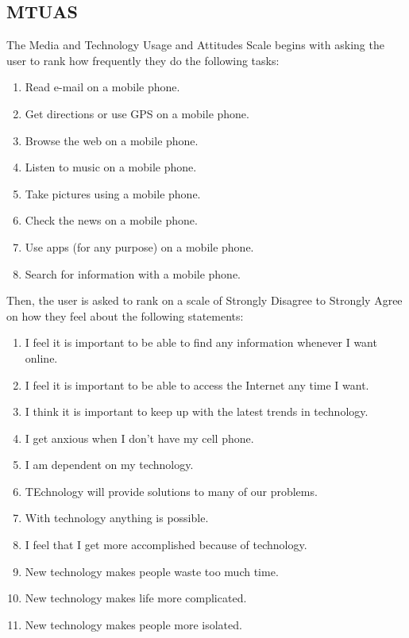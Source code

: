 \documentclass[12pt, title page, manuscript, nonacm]{acmart}
\begin{document}
\subsection*{MTUAS}
The Media and Technology Usage and Attitudes Scale begins with asking the user to rank how frequently they do the following tasks:
\begin{enumerate}
    \item Read e-mail on a mobile phone.
    \item Get directions or use GPS on a mobile phone.
    \item Browse the web on a mobile phone.
    \item Listen to music on a mobile phone.
    \item Take pictures using a mobile phone.
    \item Check the news on a mobile phone.
    \item Use apps (for any purpose) on a mobile phone.
    \item Search for information with a mobile phone.
\end{enumerate}
Then, the user is asked to rank on a scale of Strongly Disagree to Strongly Agree on how they feel about the following statements:
\begin{enumerate}
    \item I feel it is important to be able to find any information whenever I want online.
    \item I feel it is important to be able to access the Internet any time I want.
    \item I think it is important to keep up with the latest trends in technology.
    \item I get anxious when I don't have my cell phone.
    \item I am dependent on my technology.
    \item TEchnology will provide solutions to many of our problems.
    \item With technology anything is possible.
    \item I feel that I get more accomplished because of technology.
    \item New technology makes people waste too much time.
    \item New technology makes life more complicated.
    \item New technology makes people more isolated.
\end{enumerate}


\end{document}
